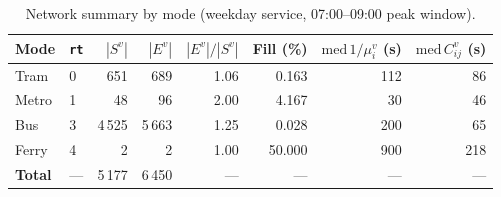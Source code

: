 \begin{table}[htbp]
\centering
\small
\begin{tabular}{llrrrrrr}
\toprule
Mode & \texttt{rt} & $|S^v|$ & $|E^v|$ & $|E^v|/|S^v|$ & Fill (\%) & $\mathrm{med}\,1/\mu^v_i$ (s) & $\mathrm{med}\,C^v_{ij}$ (s) \\
\midrule
Tram & 0 & 651 & 689 & 1.06 & 0.163 & 112 & 86 \\
Metro & 1 & 48 & 96 & 2.00 & 4.167 & 30 & 46 \\
Bus & 3 & 4\,525 & 5\,663 & 1.25 & 0.028 & 200 & 65 \\
Ferry & 4 & 2 & 2 & 1.00 & 50.000 & 900 & 218 \\
\midrule
\textbf{Total} & --- & 5\,177 & 6\,450 & --- & --- & --- & --- \\
\bottomrule
\end{tabular}
\caption{Network summary by mode (weekday service, 07:00--09:00 peak window).}
\label{tab:network}
\par{}
\end{table}
